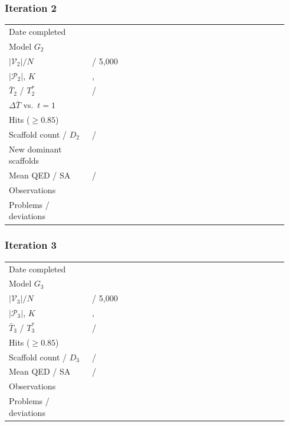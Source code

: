 \documentclass[11pt]{article}
\newcommand{\FILL}[1]{\textcolor{blue!65!black}{\underline{\textsf{#1}}}}
\newcommand{\Gmodel}{G}                         %
\newcommand{\Valid}{\mathcal{V}}                %
\newcommand{\Passed}{\mathcal{P}}               %
\newcommand{\Tbar}{\bar{T}}
\newcommand{\Tstar}{T^{*}}
\newcommand{\Ngen}{N}
\newcommand{\Kk}{K}
\begin{document}
\subsubsection*{Iteration 2}
\begin{guide}[Log]
\begin{tabular}{@{}p{0.28\linewidth}p{0.66\linewidth}@{}}
Date completed        & \FILL{} \\
Model $\Gmodel_2$     & \FILL{} \\
$|\Valid_2| / \Ngen$  & \FILL{} / 5{,}000 \\
$|\Passed_2|$, $\Kk$  & \FILL{} , \FILL{} \\
$\Tbar_2$ / $\Tstar_2$& \FILL{} / \FILL{} \\
$\Delta \Tbar$ vs.\ $t=1$ & \FILL{} \\
Hits ($\ge 0.85$)     & \FILL{} \\
Scaffold count / $D_2$& \FILL{} / \FILL{} \\
New dominant scaffolds& \FILL{} \\
Mean QED / SA         & \FILL{} / \FILL{} \\
Observations          & \FILL{} \\
Problems / deviations & \FILL{} \\
\end{tabular}
\end{guide}

\subsubsection*{Iteration 3}
\begin{guide}
\begin{tabular}{@{}p{0.28\linewidth}p{0.66\linewidth}@{}}
Date completed        & \FILL{} \\
Model $\Gmodel_3$     & \FILL{} \\
$|\Valid_3| / \Ngen$  & \FILL{} / 5{,}000 \\
$|\Passed_3|$, $\Kk$  & \FILL{} , \FILL{} \\
$\Tbar_3$ / $\Tstar_3$& \FILL{} / \FILL{} \\
Hits ($\ge 0.85$)     & \FILL{} \\
Scaffold count / $D_3$& \FILL{} / \FILL{} \\
Mean QED / SA         & \FILL{} / \FILL{} \\
Observations          & \FILL{} \\
Problems / deviations & \FILL{} \\
\end{tabular}
\end{guide}
\end{document}
